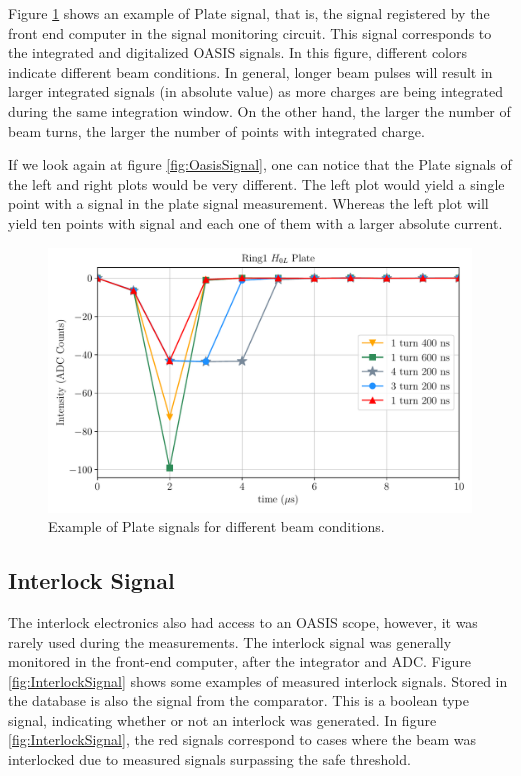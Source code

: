 Figure \ref{fig:PlateSignal} shows an example of Plate signal, that is, the signal registered by the front end computer in the signal monitoring circuit. This signal corresponds to the integrated and digitalized OASIS signals. In this figure, different colors indicate different beam conditions. In general, longer beam pulses will result in larger integrated signals (in absolute value) as more charges are being integrated during the same integration window. On the other hand, the larger the number of beam turns, the larger the number of points with integrated charge. 

If we look again at figure \ref{fig:OasisSignal}, one can notice that the Plate signals of the left and right plots would be very different. The left plot would yield a single point with a signal in the plate signal measurement. Whereas the left plot will yield ten points with signal and each one of them with a larger absolute current. 

\begin{figure}[h]
    \centering
    \includegraphics[width=0.7\columnwidth]{Figure_PlateSignal/PlateSignal.pdf}
    \caption{Example of Plate signals for different beam conditions.}
    \label{fig:PlateSignal}
\end{figure}

\subsection{Interlock Signal}

The interlock electronics also had access to an OASIS scope, however, it was rarely used during the measurements. The interlock signal was generally monitored in the front-end computer, after the integrator and ADC. Figure \ref{fig:InterlockSignal} shows some examples of measured interlock signals. Stored in the database is also the signal from the comparator. This is a boolean type signal, indicating whether or not an interlock was generated. In figure \ref{fig:InterlockSignal}, the red signals correspond to cases where the beam was interlocked due to measured signals surpassing the safe threshold. 

